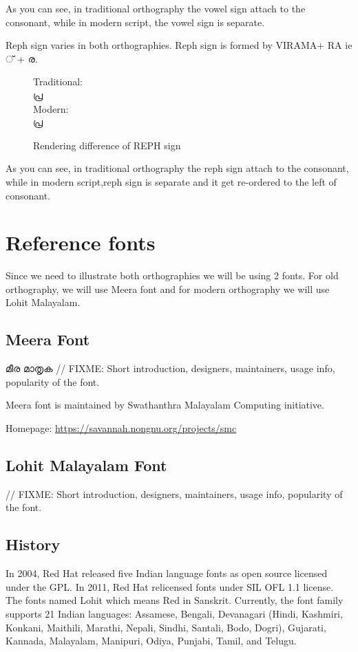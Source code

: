 As you can see, in traditional orthography the vowel sign attach to the
consonant, while in modern script, the vowel sign is separate.

Reph sign varies in both orthographies. Reph sign is formed by VIRAMA+ RA ie
{\malayalam ് + ര}.
\begin{figure}[h]
Traditional:\\ {\meera\textexample  പ്ര }\\
Modern: \\ {\lohitmalayalam\textexample  പ്ര }
   \caption{Rendering difference of REPH sign}
\end{figure}

As you can see, in traditional orthography the reph sign attach to the
consonant, while in modern script,reph sign is separate and it get re-ordered
to the left of consonant.


\section{Reference fonts}

Since we need to illustrate both orthographies we will be using 2 fonts. For
old orthography, we will use Meera font and for modern orthography we will
use Lohit Malayalam.

\subsection {Meera Font}
{\meera മീര മാതൃക }
// FIXME: Short introduction, designers, maintainers, usage info, popularity of
the font.

Meera font is maintained by Swathanthra Malayalam Computing initiative.

Homepage: {\url{https://savannah.nongnu.org/projects/smc}}

\subsection {Lohit Malayalam Font}
// FIXME: Short introduction, designers, maintainers, usage info, popularity of
the font.

\subsection {History}
In 2004, Red Hat released five Indian language fonts as open source licensed
under the GPL. In 2011, Red Hat relicensed fonts under SIL OFL 1.1 license.
The fonts named Lohit which means Red in Sanskrit. Currently, the font family
supports 21 Indian languages: Assamese, Bengali, Devanagari (Hindi, Kashmiri,
Konkani, Maithili, Marathi, Nepali, Sindhi, Santali, Bodo, Dogri), Gujarati,
Kannada, Malayalam, Manipuri, Odiya, Punjabi, Tamil, and Telugu.

